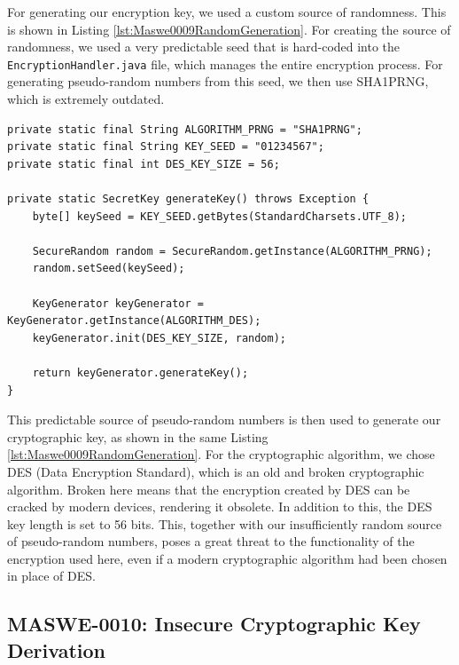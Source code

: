 For generating our encryption key, we used a custom source of randomness. This is shown in Listing \ref{lst:Maswe0009RandomGeneration}. For creating the source of randomness, we used a very predictable seed that is hard-coded into the \texttt{EncryptionHandler.java} file, which manages the entire encryption process. For generating pseudo-random numbers from this seed, we then use SHA1PRNG, which is extremely outdated.

\begin{lstlisting}[style=JavaStyle, float=tbh, mathescape=true, captionpos=b, caption={Generating a DES key of short length using a weak pseudo-random number source and a hard-coded seed}, label=lst:Maswe0009RandomGeneration]
private static final String ALGORITHM_PRNG = "SHA1PRNG";
private static final String KEY_SEED = "01234567";
private static final int DES_KEY_SIZE = 56;
    
private static SecretKey generateKey() throws Exception {
    byte[] keySeed = KEY_SEED.getBytes(StandardCharsets.UTF_8);

    SecureRandom random = SecureRandom.getInstance(ALGORITHM_PRNG);
    random.setSeed(keySeed);

    KeyGenerator keyGenerator = KeyGenerator.getInstance(ALGORITHM_DES);
    keyGenerator.init(DES_KEY_SIZE, random);

    return keyGenerator.generateKey();
}
\end{lstlisting}

This predictable source of pseudo-random numbers is then used to generate our cryptographic key, as shown in the same Listing \ref{lst:Maswe0009RandomGeneration}. For the cryptographic algorithm, we chose DES (Data Encryption Standard), which is an old and broken cryptographic algorithm. Broken here means that the encryption created by DES can be cracked by modern devices, rendering it obsolete. In addition to this, the DES key length is set to 56 bits. This, together with our insufficiently random source of pseudo-random numbers, poses a great threat to the functionality of the encryption used here, even if a modern cryptographic algorithm had been chosen in place of DES.


\subsection{MASWE-0010: Insecure Cryptographic Key Derivation}

\vspace{-3pt}

